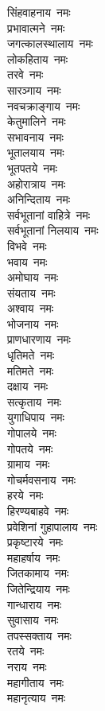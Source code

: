 \begin{multicols}{2}
\begin{flushleft}
सिंहवाहनाय~नमः\\
प्रभावात्मने~नमः\\
जगत्कालस्थालाय~नमः\\
लोकहिताय~नमः\\
तरवे~नमः\\
सारञ्गाय~नमः\\
नवचक्राङ्गाय~नमः\\
केतुमालिने~नमः\\
सभावनाय~नमः\\
भूतालयाय~नमः\hfill{}\\
भूतपतये~नमः\\
अहोरात्राय~नमः\\
अनिन्दिताय~नमः\\
सर्वभूतानां वाहित्रे~नमः\\
सर्वभूतानां निलयाय~नमः\\
विभवे~नमः\\
भवाय~नमः\\
अमोघाय~नमः\\
संयताय~नमः\\
अश्वाय~नमः\hfill{}\\
भोजनाय~नमः\\
प्राणधारणाय~नमः\\
धृतिमते~नमः\\
मतिमते~नमः\\
दक्षाय~नमः\\
सत्कृताय~नमः\\
युगाधिपाय~नमः\\
गोपालये~नमः\\
गोपतये~नमः\\
ग्रामाय~नमः\hfill{}\\
गोचर्मवसनाय~नमः\\
हरये~नमः\\
हिरण्यबाहवे~नमः\\
प्रवेशिनां गुहापालाय~नमः\\
प्रकृष्टारये~नमः\\
महाहर्षाय~नमः\\
जितकामाय~नमः\\
जितेन्द्रियाय~नमः\\
गान्धाराय~नमः\\
सुवासाय~नमः\hfill{}\\
तपस्सक्ताय~नमः\\
रतये~नमः\\
नराय~नमः\\
महागीताय~नमः\\
महानृत्याय~नमः\\

\end{flushleft}
\end{multicols}
